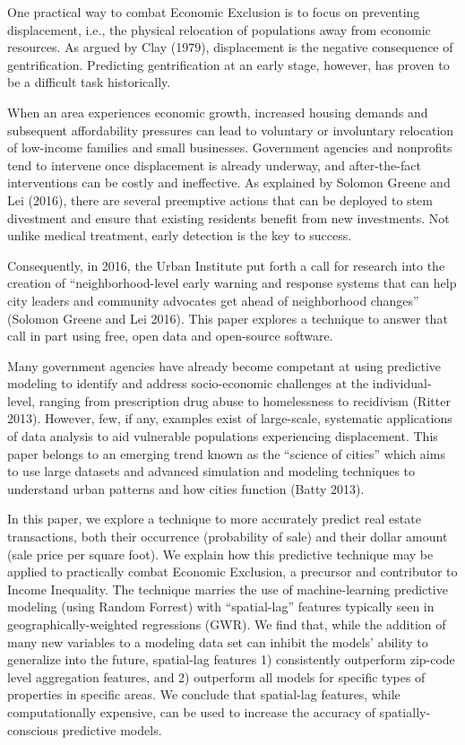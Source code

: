 \documentclass[12pt,]{article}
\begin{document}
One practical way to combat Economic Exclusion is to focus on preventing
displacement, i.e., the physical relocation of populations away from
economic resources. As argued by Clay (1979), displacement is the
negative consequence of gentrification. Predicting gentrification at an
early stage, however, has proven to be a difficult task historically.

When an area experiences economic growth, increased housing demands and
subsequent affordability pressures can lead to voluntary or involuntary
relocation of low-income families and small businesses. Government
agencies and nonprofits tend to intervene once displacement is already
underway, and after-the-fact interventions can be costly and
ineffective. As explained by Solomon Greene and Lei (2016), there are
several preemptive actions that can be deployed to stem divestment and
ensure that existing residents benefit from new investments. Not unlike
medical treatment, early detection is the key to success.

Consequently, in 2016, the Urban Institute put forth a call for research
into the creation of ``neighborhood-level early warning and response
systems that can help city leaders and community advocates get ahead of
neighborhood changes'' (Solomon Greene and Lei 2016). This paper
explores a technique to answer that call in part using free, open data
and open-source software.

Many government agencies have already become competant at using
predictive modeling to identify and address socio-economic challenges at
the individual-level, ranging from prescription drug abuse to
homelessness to recidivism (Ritter 2013). However, few, if any, examples
exist of large-scale, systematic applications of data analysis to aid
vulnerable populations experiencing displacement. This paper belongs to
an emerging trend known as the ``science of cities'' which aims to use
large datasets and advanced simulation and modeling techniques to
understand urban patterns and how cities function (Batty 2013).

In this paper, we explore a technique to more accurately predict real
estate transactions, both their occurrence (probability of sale) and
their dollar amount (sale price per square foot). We explain how this
predictive technique may be applied to practically combat Economic
Exclusion, a precursor and contributor to Income Inequality. The
technique marries the use of machine-learning predictive modeling (using
Random Forrest) with ``spatial-lag'' features typically seen in
geographically-weighted regressions (GWR). We find that, while the
addition of many new variables to a modeling data set can inhibit the
models' ability to generalize into the future, spatial-lag features 1)
consistently outperform zip-code level aggregation features, and 2)
outperform all models for specific types of properties in specific
areas. We conclude that spatial-lag features, while computationally
expensive, can be used to increase the accuracy of spatially-conscious
predictive models.
\end{document}
